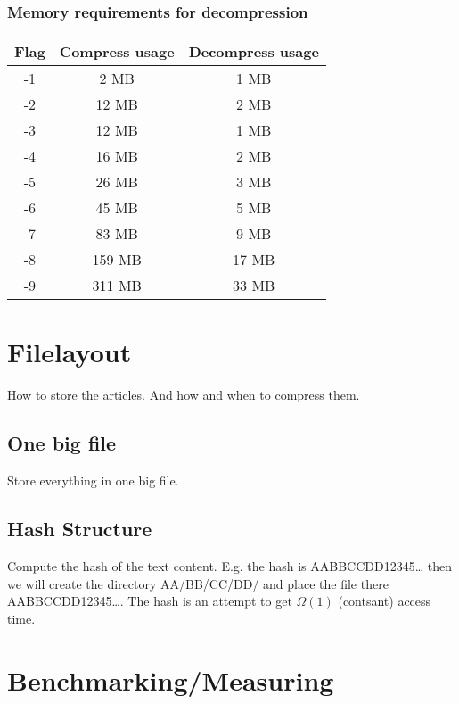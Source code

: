 \documentclass{article}
\begin{document}
\subsubsection{Memory requirements for decompression}
\begin{tabular}{|c|c|c|}
\hline
Flag   & Compress usage &   Decompress usage \\ \hline
-1     & 2 MB        &       1 MB \\ \hline
-2     &    12 MB    &           2 MB \\ \hline
-3     &    12 MB    &           1 MB \\ \hline
-4     &    16 MB    &           2 MB \\ \hline
-5     &    26 MB    &           3 MB \\ \hline
-6     &    45 MB    &           5 MB \\ \hline
-7     &    83 MB    &           9 MB \\ \hline
-8     &   159 MB    &          17 MB \\ \hline
-9     &   311 MB    &          33 MB \\ \hline
\end{tabular}


\section{Filelayout}
How to store the articles. And how and when to compress them.

\subsection{One big file}
Store everything in one big file.

\subsection{Hash Structure}
Compute the hash of the text content. E.g. the hash is AABBCCDD12345\ldots
then we will create the directory AA/BB/CC/DD/ and place the file
there AABBCCDD12345\ldots. The hash is an attempt to get $\Omega(1)$ (contsant)
access time.

\section{Benchmarking/Measuring}
\end{document}
